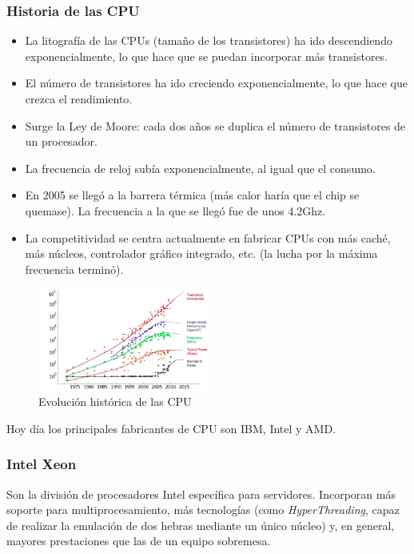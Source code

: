 \documentclass[12pt,spanish]{article}
\begin{document}
\subsubsection{Historia de las CPU}
\begin{itemize}
	\item La litografía de las CPUs (tamaño de los transistores) ha ido descendiendo exponencialmente, lo que hace que se puedan incorporar más transistores.
	\item El número de transistores ha ido creciendo exponencialmente, lo que hace que crezca el rendimiento.
	\item Surge la Ley de Moore: cada dos años se duplica el número de transistores de un procesador.
	\item La frecuencia de reloj subía exponencialmente, al igual que el consumo.
	\item En 2005 se llegó a la barrera térmica (más calor haría que el chip se quemase). La frecuencia a la que se llegó fue de unos 4.2Ghz.
	\item La competitividad se centra actualmente en fabricar CPUs con más caché, más núcleos, controlador gráfico integrado, etc. (la lucha por la máxima frecuencia terminó).
\end{itemize}

\begin{figure}[H]
	\centering
	\includegraphics[width=0.5\textwidth]{cpuhistory.png}
	\caption{Evolución histórica de las CPU}
\end{figure}

Hoy día los principales fabricantes de CPU son IBM, Intel y AMD.

\subsubsection{Intel Xeon}

Son la división de procesadores Intel específica para servidores. Incorporan más soporte para multiprocesamiento, más tecnologías (como \textit{HyperThreading}, capaz de realizar la emulación de dos hebras mediante un único núcleo) y, en general, mayores prestaciones que las de un equipo sobremesa.\\
\end{document}
